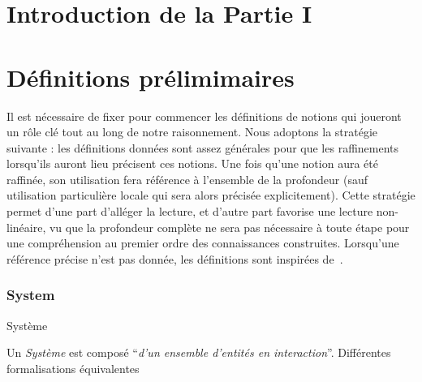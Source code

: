 

\chapter*{Introduction de la Partie I}


























\chapter*{Définitions prélimimaires}

Il est nécessaire de fixer pour commencer les définitions de notions qui joueront un rôle clé tout au long de notre raisonnement. Nous adoptons la stratégie suivante : les définitions données sont assez générales pour que les raffinements lorsqu'ils auront lieu précisent ces notions. Une fois qu'une notion aura été raffinée, son utilisation fera référence à l'ensemble de la profondeur (sauf utilisation particulière locale qui sera alors précisée explicitement). Cette stratégie permet d'une part d'alléger la lecture, et d'autre part favorise une lecture non-linéaire, vu que la profondeur complète ne sera pas nécessaire à toute étape pour une compréhension au premier ordre des connaissances construites. Lorsqu'une référence précise n'est pas donnée, les définitions sont inspirées de~\cite{hypergeo}. 


\subsection*{System}{Système}

Un \emph{Système} est composé ``\textit{d'un ensemble d'entités en interaction}''. Différentes formalisations équivalentes


